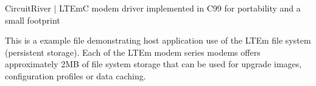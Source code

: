 Circuit\+River $\vert$ LTEmC modem driver implemented in C99 for portability and a small footprint

This is a example file demonstrating host application use of the LTEm file system (persistent storage). Each of the LTEm modem series modems offers approximately 2MB of file system storage that can be used for upgrade images, configuration profiles or data caching. 